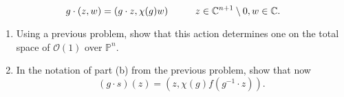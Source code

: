 \documentclass[12pt]{article}
\theoremstyle{definition}
\theoremstyle{theorem}
\begin{document}
\begin{enumerate}
\[
g \cdot (z, w) = (g \cdot z, \chi(g) w) \hspace{10mm} z \in \mathbb{C}^{n+1} \setminus 0, w \in \mathbb{C}. 
\]
\begin{enumerate}
\item Using a previous problem, show that this action determines one on the total space of $\mathcal{O}(1)$ over $\mathbb{P}^n$. 
\item In the notation of part (b) from the previous problem, show that now 
\[
(g \cdot s)(z) = (z, \chi(g) f(g^{-1} \cdot z)).
\]
\end{enumerate}
\end{enumerate}
\end{document}
